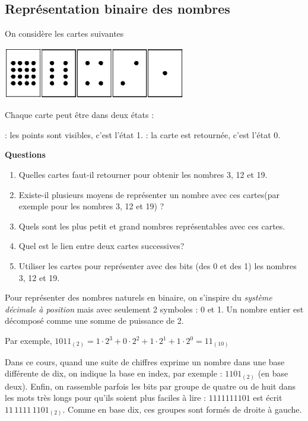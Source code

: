 \subsection{Représentation binaire des nombres}
\act On considère les cartes suivantes 
\begin{center}
	\includegraphics[trim=0 10 0 10,width=0.6\textwidth]{Images/intro/carte.jpg}
\end{center}
Chaque carte peut être dans deux états : 
\begin{itemize}
	 : les points sont visibles, c'est l'état 1.
	 : la carte est retournée, c'est l'état 0.
\end{itemize}
\textbf{Questions}
\begin{enumerate}
	\item Quelles cartes faut-il retourner pour obtenir les nombres  3, 12 et 19.
	\item Existe-il plusieurs moyens de représenter un nombre avec ces cartes(par exemple pour les nombres 3, 12 et 19) ?
	\item Quels sont les plus petit et  grand nombres représentables avec ces cartes.
	\item Quel est le lien entre deux cartes successives?
	\item Utiliser les cartes pour représenter avec des bits (des 0 et des 1) les nombres 3, 12 et 19.
\end{enumerate}
\eexo \eexo
Pour représenter des nombres naturels en binaire, on s'inspire du \textit{système  décimale à position} mais avec seulement 2 symboles :	0 et 1. Un nombre entier est décomposé comme une somme de puissance de 2. 

Par exemple, $1011_{(2)}=1 \cdot 2^3 + 0 \cdot 2^2 +1 \cdot 2^1 + 1\cdot 2^0=11_{(10)}$ 

\begin{important}
	Dans ce cours, quand une suite de chiffres exprime un nombre dans une base différente de dix, on indique la
	base en index, par exemple : $1101_{(2)}$ (en base deux). Enfin, on rassemble parfois les bits par groupe de quatre ou de huit dans les mots très longs pour qu’ils soient plus faciles à lire : $1111111101$ est écrit $11 \,1111\, 1101_{(2)}$. Comme en base dix, ces groupes sont formés de droite à gauche.
\end{important}	

